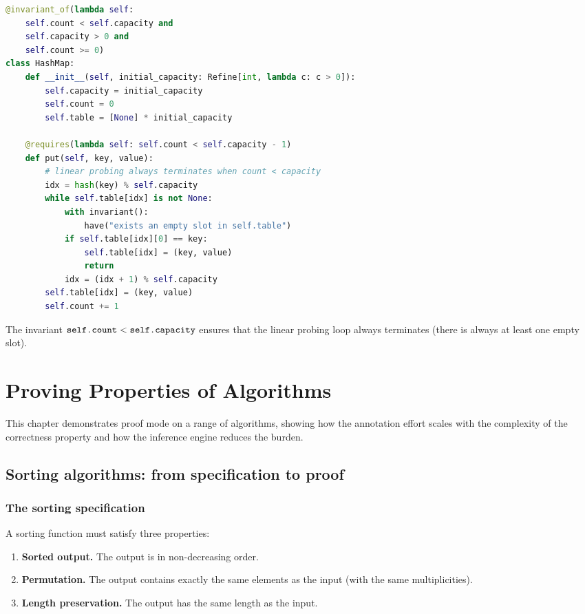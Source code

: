 \documentclass[11pt]{report}
\DeclareRobustCommand{\py}[1]{\texttt{\detokenize{#1}}}
\theoremstyle{definition}
\theoremstyle{plain}
\begin{document}
\begin{lstlisting}[style=deppy,language=Python]
@invariant_of(lambda self:
    self.count < self.capacity and
    self.capacity > 0 and
    self.count >= 0)
class HashMap:
    def __init__(self, initial_capacity: Refine[int, lambda c: c > 0]):
        self.capacity = initial_capacity
        self.count = 0
        self.table = [None] * initial_capacity

    @requires(lambda self: self.count < self.capacity - 1)
    def put(self, key, value):
        # linear probing always terminates when count < capacity
        idx = hash(key) % self.capacity
        while self.table[idx] is not None:
            with invariant():
                have("exists an empty slot in self.table")
            if self.table[idx][0] == key:
                self.table[idx] = (key, value)
                return
            idx = (idx + 1) % self.capacity
        self.table[idx] = (key, value)
        self.count += 1
\end{lstlisting}

The invariant $\py{self.count} < \py{self.capacity}$ ensures that the linear
probing loop always terminates (there is always at least one empty slot).

\chapter{Proving Properties of Algorithms}

This chapter demonstrates proof mode on a range of algorithms, showing how
the annotation effort scales with the complexity of the correctness property
and how the inference engine reduces the burden.

\section{Sorting algorithms: from specification to proof}

\subsection{The sorting specification}

A sorting function must satisfy three properties:
\begin{enumerate}[nosep]
  \item \textbf{Sorted output.} The output is in non-decreasing order.
  \item \textbf{Permutation.} The output contains exactly the same elements
        as the input (with the same multiplicities).
  \item \textbf{Length preservation.} The output has the same length as the
        input.
\end{enumerate}
\end{document}
